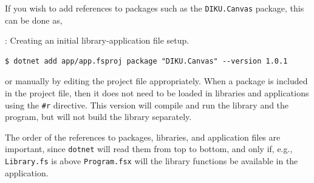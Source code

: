 \documentclass[fsharpNotes.tex]{subfiles}
\begin{document}
If you wish to add references to packages such as the \lstinline{DIKU.Canvas} package, this can be done as,
\begin{codeNOutput}[label=dotnetNew,
  top=-5pt,
  bottom=-5pt,
  left=-2pt,
  right=-2pt,
]{: Creating an initial library-application file setup.}
  \begin{lstlisting}[language=console,escapechar=§]
$ dotnet add app/app.fsproj package "DIKU.Canvas" --version 1.0.1
\end{lstlisting}%
\end{codeNOutput}
or manually by editing the project file appropriately. When a package is included in the project file, then it does not need to be loaded in libraries and applications using the \lstinline{#r} directive. This version will compile and run the library and the program, but will not build the library separately.

The order of the references to packages, libraries, and application files are important, since \lstinline[language=console]{dotnet} will read them from top to bottom, and only if, e.g., \lstinline[language=console]{Library.fs} is above \lstinline[language=console]{Program.fsx} will the library functions be available in the application.
\end{document}
